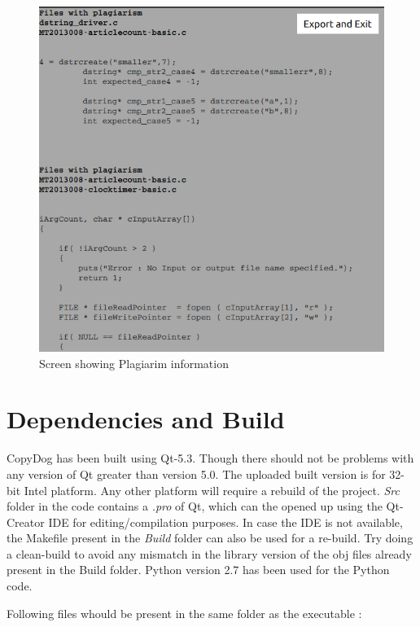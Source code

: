 \documentclass[11pt]{article}
\begin{document}
\begin{figure}[p]
    \centering
    \includegraphics[scale=.5]{PlagInfoScreen.png}
    \caption{Screen showing Plagiarim information}
\end{figure}


\section {Dependencies and Build} 

CopyDog has been built using Qt-5.3. Though there should not be problems with any version of Qt greater than version 5.0. The uploaded built version is for 32-bit Intel platform. Any other platform will require a rebuild of the project. \emph{Src} folder in the code contains a \emph{.pro} of Qt, which can the opened up using the Qt-Creator IDE for editing/compilation purposes. In case the IDE is not available, the Makefile present in the \emph{Build} folder can also be used for a re-build. Try doing a clean-build to avoid any mismatch in the library version of the obj files already present in the Build folder. Python version 2.7 has been used for the Python code.

\vspace{3mm}
\noindent Following files whould be present in the same folder as the  executable : 
\end{document}
